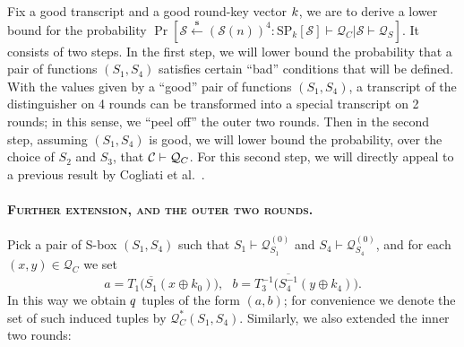 Fix a good transcript and a good round-key vector $\mathnormal{k}$, we are to derive a lower bound for the probability  $\operatorname{Pr}\left[\mathcal{S} \stackrel{\mathbf{s}}{\leftarrow}(\mathcal{S}(n))^{4}: \mathrm{SP}_{k}[\mathcal{S}] \vdash \mathcal{Q}_{C} | \mathcal{S} \vdash \mathcal{Q}_{S}\right]$. It consists of two steps. In the first step, we will lower bound the probability that a pair of functions $(S_{1}, S_{4})$  satisfies certain ``bad'' conditions that will be defined. With the values given by a ``good'' pair of functions $(S_{1}, S_{4})$, a transcript of the distinguisher on 4 rounds can be transformed into a special transcript on 2 rounds; in this sense, we ``peel off'' the outer two rounds. Then in the second step, assuming $(S_{1}, S_{4})$ is good, we will lower bound the probability, over the choice of $S_2$ and $S_3$, that $\mathcal{C}\vdash\mathcal{Q}_{C}$. For this second step, we will directly appeal to a previous result by
Cogliati et al.~\cite{C:CDKLST18}.





\paragraph{\textsc{Further extension, and the outer two rounds.}} Pick a pair of S-box $(S_1, S_4)$ such that $S_{1} \vdash \mathcal{Q}_{S_{1}}^{(0)}$ and $S_{4} \vdash \mathcal{Q}_{S_{4}}^{(0)}$, and for each $ (x, y) \in \mathcal{Q}_{C}$ we set
%
$$a=T_1\big(\overline{S_1}\left(x \oplus k_{0}\right)\big),\ \ \  b=T_3^{-1}\big(\overline{S_{4}^{-1}}\left(y \oplus k_{4}\right)\big).$$
%
In this way we obtain $\mathnormal{q}$ tuples of the form $(a,b)$; for convenience we denote the set of such induced tuples by $\mathcal{Q}_{C}^{*}\left(S_{1}, S_{4}\right)$. Similarly, we also extended the inner two rounds:



